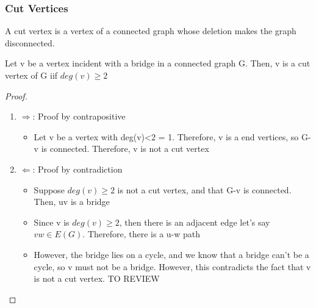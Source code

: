 \documentclass{article}
\begin{document}
\subsubsection{Cut Vertices}

\begin{definition}
    A cut vertex is a vertex of a connected graph whose deletion makes the
    graph disconnected.
\end{definition}

\begin{theorem}
    Let v be a vertex incident with a bridge in a connected graph G. Then, v
    is a cut vertex of G iif $deg(v) \geq 2$
\end{theorem}

\begin{proof}
    \begin{enumerate}
        \item $\Longrightarrow$: Proof by contrapositive
	    \begin{itemize}
		\item Let v be a vertex with deg(v)<2 = 1. Therefore, v
		    is a end vertices, so G-v is connected. Therefore, v is
		    not a cut vertex
	    \end{itemize}
        \item $\Longleftarrow$: Proof by contradiction
	    \begin{itemize}
		\item Suppose $deg(v) \geq 2$ is not a cut vertex, and that
		    G-v is connected. Then, uv is a bridge
		\item Since v is $deg(v) \geq 2$, then there is an adjacent edge
		    let's say $vw \in E(G)$. Therefore, there is a u-w path
		\item However, the bridge lies on a cycle, and we know that a
		    bridge can't be a cycle, so v must not be a bridge. However,
		    this contradicts the fact that v is not a cut vertex.
		    TO REVIEW
	    \end{itemize}
    \end{enumerate}
\end{proof}

\end{document}
